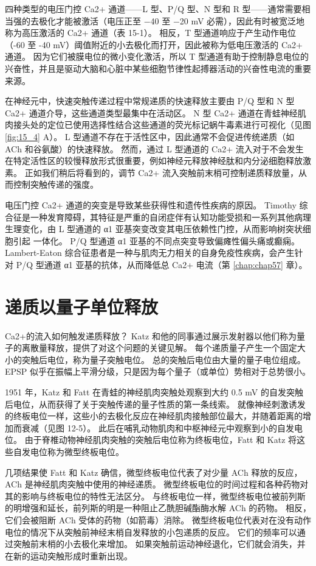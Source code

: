 四种类型的电压门控 Ca2+ 通道——L 型、P/Q 型、N 型和 R 型——通常需要相当强的去极化才能被激活（电压正至 −40 至 −20 mV 必需），因此有时被宽泛地称为高压激活的 Ca2+ 通道（表 15-1）。 
相反，T 型通道响应于产生动作电位（-60 至 -40 mV）阈值附近的小去极化而打开，因此被称为低电压激活的 Ca2+ 通道。 
因为它们被膜电位的微小变化激活，所以 T 型通道有助于控制静息电位的兴奋性，并且是驱动大脑和心脏中某些细胞节律性起搏器活动的兴奋性电流的重要来源。


在神经元中，快速突触传递过程中常规递质的快速释放主要由 P/Q 型和 N 型 Ca2+ 通道介导，这些通道类型最集中在活动区。 
N 型 Ca2+ 通道在青蛙神经肌肉接头处的定位已使用选择性结合这些通道的荧光标记蜗牛毒素进行可视化（见图 \ref{fig:15_4} A）。 
L 型通道不存在于活性区中，因此通常不会促进传统递质（如 ACh 和谷氨酸）的快速释放。 
然而，通过 L 型通道的 Ca2+ 流入对于不会发生在特定活性区的较慢释放形式很重要，例如神经元释放神经肽和内分泌细胞释放激素。 
正如我们稍后将看到的，调节 Ca2+ 流入突触前末梢可控制递质释放量，从而控制突触传递的强度。


电压门控 Ca2+ 通道的突变是导致某些获得性和遗传性疾病的原因。 
Timothy 综合征是一种发育障碍，其特征是严重的自闭症伴有认知功能受损和一系列其他病理生理变化，由 L 型通道的 α1 亚基突变改变其电压依赖性门控，从而影响树突状细胞引起 一体化。 
P/Q 型通道 α1 亚基的不同点突变导致偏瘫性偏头痛或癫痫。 
Lambert-Eaton 综合征患者是一种与肌肉无力相关的自身免疫性疾病，会产生针对 P/Q 型通道 α1 亚基的抗体，从而降低总 Ca2+ 电流（第 \ref{chap:chap57} 章）。



\section{递质以量子单位释放}
Ca2+的流入如何触发递质释放？ 
Katz 和他的同事通过展示发射器以他们称为量子的离散量释放，提供了对这个问题的关键见解。 
每个递质量子产生一个固定大小的突触后电位，称为量子突触电位。 
总的突触后电位由大量的量子电位组成。 
EPSP 似乎在振幅上平滑分级，只是因为每个量子（或单位）势相对于总势很小。


1951 年，Katz 和 Fatt 在青蛙的神经肌肉突触处观察到大约 0.5 mV 的自发突触后电位，从而获得了关于突触传递的量子性质的第一条线索。 
就像神经刺激诱发的终板电位一样，这些小的去极化反应在神经肌肉接触部位最大，并随着距离的增加而衰减（见图 12-5）。 
此后在哺乳动物肌肉和中枢神经元中观察到小的自发电位。 
由于脊椎动物神经肌肉突触的突触后电位称为终板电位，Fatt 和 Katz 将这些自发电位称为微型终板电位。


几项结果使 Fatt 和 Katz 确信，微型终板电位代表了对少量 ACh 释放的反应，ACh 是神经肌肉突触中使用的神经递质。 
微型终板电位的时间过程和各种药物对其的影响与终板电位的特性无法区分。 
与终板电位一样，微型终板电位被前列斯的明增强和延长，前列斯的明是一种阻止乙酰胆碱酯酶水解 ACh 的药物。 
相反，它们会被阻断 ACh 受体的药物（如箭毒）消除。 
微型终板电位代表对在没有动作电位的情况下从突触前神经末梢自发释放的小包递质的反应。 
它们的频率可以通过突触前末梢的小去极化来增加。 
如果突触前运动神经退化，它们就会消失，并在新的运动突触形成时重新出现。


